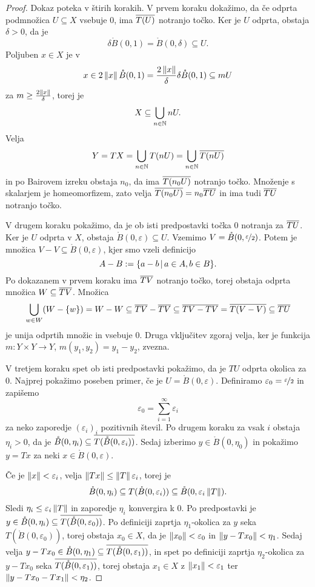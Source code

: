 \begin{proof}
  Dokaz poteka v štirih korakih.
  V prvem koraku dokažimo, da če odprta podmnožica $U \subseteq X$ vsebuje $0$,
  ima $\overline{T(U)}$ notranjo točko.
  Ker je $U$ odprta, obstaja $\delta > 0$, da je
  \[
	\delta \mathring{B}(0, 1) = \mathring{B}(0,\delta) \subseteq U.
  \]
  Poljuben $x \in X$ je v
  \[
	x \in 2 \left\lVert x\right\rVert \mathring{B}(0,1)
	= \frac{2 \left\lVert x\right\rVert}{\delta} \delta \mathring{B}(0,1) \subseteq m U
  \]
  za $m \ge \frac{2 \left\lVert x\right\rVert}{\delta}$, torej je
  \[
	X \subseteq \bigcup_{n \in \mathbb{N}} n U.
  \]
  Velja
  \[
	Y = TX = \bigcup_{n \in \mathbb{N}} T(n U)
	= \bigcup_{n \in \mathbb{N}} \overline{T(n U)}
  \]
  in po Bairovem izreku obstaja $n_0$, da ima $\overline{T(n_0 U)}$ notranjo točko.
  Množenje s skalarjem je homeomorfizem, zato velja $\overline{T(n_0 U)} = n_0
  \overline{TU}$ in ima tudi $\overline{TU}$ notranjo točko.

  V drugem koraku pokažimo, da je ob isti predpostavki točka $0$ notranja za
  $\overline{TU}$.
  Ker je $U$ odprta v $X$, obstaja $\mathring{B}(0,\varepsilon) \subseteq U$.
  Vzemimo $V = \mathring{B}(0, \nicefrac{\varepsilon}{2})$.
  Potem je množica $V - V \subseteq \mathring{B}(0, \varepsilon)$, kjer smo
  vzeli definicijo
  \[
	A - B := \{ a - b \,|\, a \in A, b \in B \}.
  \]
  Po dokazanem v prvem koraku ima $\overline{TV}$ notranjo točko, torej obstaja odprta
  množica $W \subseteq \overline{TV}$.
  Množica
  \[
	\bigcup_{w \in W} (W - \{w\}) = W - W
	\subseteq \overline{TV} - \overline{TV}
	\subseteq \overline{TV - TV}
	= \overline{T(V - V)}
	\subseteq \overline{TU}
  \]
  je unija odprtih množic in vsebuje $0$.
  Druga vključitev zgoraj velja, ker je funkcija $m: Y \times Y \to Y$, $m(y_1,
  y_2) = y_1 - y_2$, zvezna.

  V tretjem koraku spet ob isti predpostavki pokažimo, da je $TU$ odprta okolica
  za $0$.
  Najprej pokažimo poseben primer, če je $U = \mathring{B}(0, \varepsilon)$.
  Definiramo $\varepsilon_0 = \nicefrac{\varepsilon}{2}$ in zapišemo
  \[
	\varepsilon_0 = \sum_{i=1}^\infty \varepsilon_i
  \]
  za neko zaporedje $(\varepsilon_i)_i$ pozitivnih števil.
  Po drugem koraku za vsak $i$ obstaja $\eta_i > 0$, da je $\mathring{B}(0,
  \eta_i) \subseteq \overline{T(\mathring{B}(0, \varepsilon_i))}$.
  Sedaj izberimo $y \in \mathring{B}(0, \eta_0)$ in pokažimo $y = Tx$ za neki $x
  \in \mathring{B}(0, \varepsilon)$.

  Če je $\left\lVert x\right\rVert < \varepsilon_i$, velja $\left\lVert Tx\right\rVert \le \left\lVert T\right\rVert
  \varepsilon_i$, torej je
  \[
	\mathring{B}(0, \eta_i)
	\subseteq T(\mathring{B}(0, \varepsilon_i))
	\subseteq \mathring{B}(0, \varepsilon_i \left\lVert T\right\rVert).
  \]
  Sledi $\eta_i \le \varepsilon_i \left\lVert T\right\rVert$ in zaporedje $\eta_i$ konvergira k
  $0$.
  Po predpostavki je $y \in \mathring{B}(0,\eta_i) \subseteq
  \overline{T(\mathring{B}(0, \varepsilon_0))}$.
  Po definiciji zaprtja $\eta_1$-okolica za $y$ seka $T(\mathring{B}(0,
  \varepsilon_0))$, torej obstaja $x_0 \in X$, da je $\left\lVert x_0\right\rVert <
  \varepsilon_0$ in $\left\lVert y - Tx_0\right\rVert < \eta_1$.
  Sedaj velja $y - Tx_0 \in \mathring{B}(0, \eta_1) \subseteq
  \overline{T(\mathring{B}(0, \varepsilon_1))}$, in spet po definiciji zaprtja
  $\eta_2$-okolica za $y - Tx_0$ seka $\overline{T(\mathring{B}(0, \varepsilon_1))}$,
  torej obstaja $x_1 \in X$ z $\left\lVert x_1\right\rVert < \varepsilon_1$ ter $\left\lVert y - Tx_0 -
	Tx_1\right\rVert < \eta_2$.


\end{proof}
